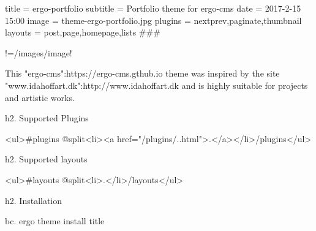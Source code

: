 title = ergo-portfolio
subtitle = Portfolio theme for ergo-cms
date = 2017-2-15 15:00
image = theme-ergo-portfolio.jpg
plugins = nextprev,paginate,thumbnail
layouts = post,page,homepage,lists
###

!=/images/{{image}}!

This "ergo-cms":https://ergo-cms.gthub.io theme was inspired by the site "www.idahoffart.dk":http://www.idahoffart.dk and is highly suitable for projects and artistic works.

h2. Supported Plugins

<ul>{{#plugins @split}}<li><a href="/plugins/{{.}}.html">{{.}}</a></li>{{/plugins}}</ul>

h2. Supported layouts

<ul>{{#layouts @split}}<li>{{.}}</li>{{/layouts}}</ul>

h2. Installation

bc. ergo theme install {{title}}




